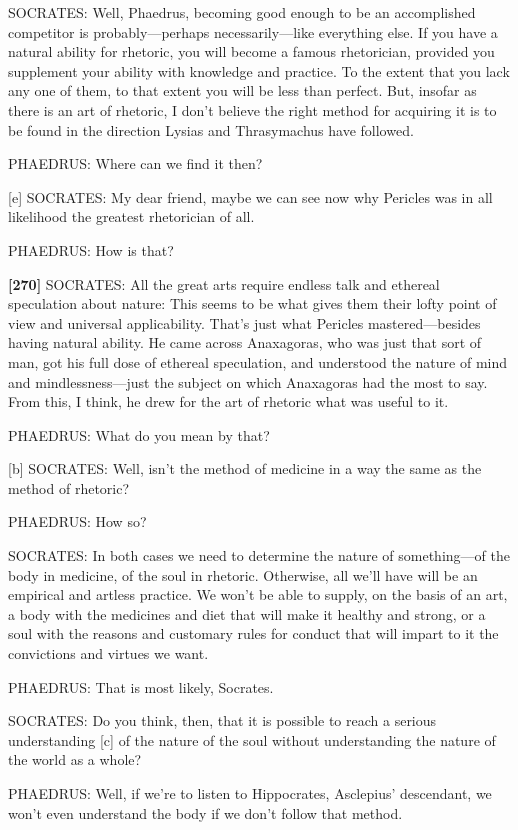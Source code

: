 SOCRATES: Well, Phaedrus, becoming good enough to be an accomplished
competitor is probably---perhaps necessarily---like everything else. If
you have a natural ability for rhetoric, you will become a famous
rhetorician, provided you supplement your ability with knowledge and
practice. To the extent that you lack any one of them, to that extent
you will be less than perfect. But, insofar as there is an art of
rhetoric, I don't believe the right method for acquiring it is to be
found in the direction Lysias and Thrasymachus have followed.

PHAEDRUS: Where can we find it then?

{[}e{]} SOCRATES: My dear friend, maybe we can see now why Pericles was
in all likelihood the greatest rhetorician of all.

PHAEDRUS: How is that?

{\bf {[}270{]}} SOCRATES: All the great arts require endless talk and
ethereal speculation about nature: This seems to be what gives them
their lofty point of view and universal applicability. That's just what
Pericles mastered---besides having natural ability. He came across
Anaxagoras, who was just that sort of man, got his full dose of ethereal
speculation, and understood the nature of mind and
mindlessness---just
the subject on which Anaxagoras had the most to say. From this, I think,
he drew for the art of rhetoric what was useful to it.

PHAEDRUS: What do you mean by that?

{[}b{]} SOCRATES: Well, isn't the method of medicine in a way the same
as the method of rhetoric?

PHAEDRUS: How so?

SOCRATES: In both cases we need to determine the nature of
something---of the body in medicine, of the soul in rhetoric. Otherwise,
all we'll have will be an empirical and artless practice. We won't be
able to supply, on the basis of an art, a body with the medicines and
diet that will make it healthy and strong, or a soul with the reasons
and customary rules for conduct that will impart to it the convictions
and virtues we want.

PHAEDRUS: That is most likely, Socrates.

SOCRATES: Do you think, then, that it is possible to reach a serious
understanding {[}c{]} of the nature of the soul without understanding
the nature of the world as a whole?

PHAEDRUS: Well, if we're to listen to Hippocrates, Asclepius'
descendant, we won't
even understand the body if we don't follow that method.

